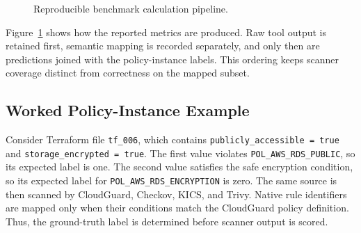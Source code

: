 \documentclass[conference]{IEEEtran}
\begin{document}
\begin{figure}[t]
\centering
{}
\caption{Reproducible benchmark calculation pipeline.}
\label{fig:benchmark-pipeline}
\end{figure}
Figure~\ref{fig:benchmark-pipeline} shows how the reported metrics are produced. Raw tool output is retained first, semantic mapping is recorded separately, and only then are predictions joined with the policy-instance labels. This ordering keeps scanner coverage distinct from correctness on the mapped subset.

\subsection{Worked Policy-Instance Example}
Consider Terraform file \texttt{tf\_006}, which contains
\texttt{publicly\_accessible = true} and
\texttt{storage\_encrypted = true}. The first value violates
\texttt{POL\_AWS\_RDS\_PUBLIC}, so its expected label is one. The second value
satisfies the safe encryption condition, so its expected label for
\texttt{POL\_AWS\_RDS\_ENCRYPTION} is zero. The same source is then scanned by
CloudGuard, Checkov, KICS, and Trivy. Native rule identifiers are mapped only
when their conditions match the CloudGuard policy definition. Thus, the
ground-truth label is determined before scanner output is scored.
\end{document}
